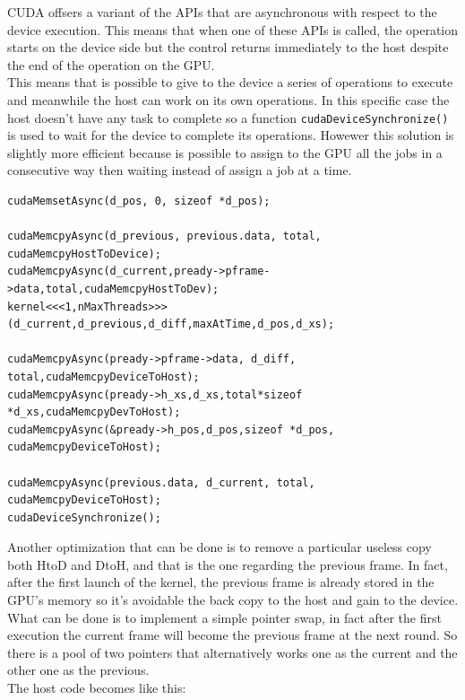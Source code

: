 \documentclass[paper=a4, fontsize=10pt]{scrartcl}	%
\begin{document}
	CUDA offsers a variant of the APIs that are asynchronous with respect to the device execution. This means that when one of these APIs is called, the operation starts on the device side but the control returns immediately to the host despite the end of the operation on the GPU.\\

	This means that is possible to give to the device a series of operations to execute and meanwhile the host can work on its own operations. In this specific case the host doesn't have any task to complete so a function \texttt{cudaDeviceSynchronize()} is used to wait for the device to complete its operations. Howewer this solution is slightly more efficient because is possible to assign to the GPU all the jobs in a consecutive way then waiting instead of assign a job at a time.

	\begin{lstlisting}[style=CStyle]
cudaMemsetAsync(d_pos, 0, sizeof *d_pos);

cudaMemcpyAsync(d_previous, previous.data, total, cudaMemcpyHostToDevice);
cudaMemcpyAsync(d_current,pready->pframe->data,total,cudaMemcpyHostToDev);
kernel<<<1,nMaxThreads>>>(d_current,d_previous,d_diff,maxAtTime,d_pos,d_xs);

cudaMemcpyAsync(pready->pframe->data, d_diff, total,cudaMemcpyDeviceToHost);
cudaMemcpyAsync(pready->h_xs,d_xs,total*sizeof *d_xs,cudaMemcpyDevToHost);
cudaMemcpyAsync(&pready->h_pos,d_pos,sizeof *d_pos, cudaMemcpyDeviceToHost);

cudaMemcpyAsync(previous.data, d_current, total, cudaMemcpyDeviceToHost);
cudaDeviceSynchronize();
	\end{lstlisting}


	Another optimization that can be done is to remove a particular useless copy both HtoD and DtoH, and that is the one regarding the previous frame. In fact, after the first launch of the kernel, the previous frame is already stored in the GPU's memory so it's avoidable the back copy to the host and gain to the device. What can be done is to implement a simple pointer swap, in fact after the first execution the current frame will become the previous frame at the next round. So there is a pool of two pointers that alternatively works one as the current and the other one as the previous.\\

	The host code becomes like this:
\end{document}
